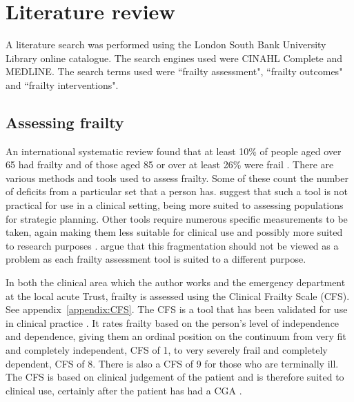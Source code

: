 \documentclass
[
	12pt,
	a4paper,
	oneside,
]{article}
\begin{document}
\section{Literature review}

A literature search was performed using the London South Bank University Library 
online catalogue. The search engines used were CINAHL Complete and MEDLINE. The
search terms used were ``frailty assessment", ``frailty outcomes" and ``frailty 
interventions".

\subsection{Assessing frailty}
An international systematic review found 
that at least 10\% of people aged over 65 had frailty and of those aged 85 or over
at least 26\% were frail \parencite{collard:12}. There are various methods and tools used to assess frailty.
Some of these count the number of deficits from a particular set that a person has. 
\textcite{sternberg:08} suggest that such a tool is not practical for use in a clinical
setting, being more suited to assessing populations for strategic planning. 
Other tools require numerous specific measurements to be taken, again making them
less suitable for clinical use \parencite{martin:08} and possibly more suited to research purposes
\parencite{ensrud:08}. \textcite{romero-ortuno:16} argue that this fragmentation should not
be viewed as a problem as each frailty assessment tool is suited to a different 
purpose. 

In both the clinical area which the author works and the emergency department at
the local acute Trust, frailty is assessed using the Clinical Frailty Scale (CFS).
See appendix~\ref{appendix:CFS}.
The CFS is a tool that has been validated for use in clinical practice 
\parencite{rockwood:05}. It rates frailty based on the person's level of independence
and dependence, giving them an ordinal position on the continuum from very fit and completely 
independent, CFS of 1, to very severely frail and completely dependent, CFS of 8.
There is also a CFS of 9 for those who are terminally ill. The CFS is based on clinical
judgement of the patient and is therefore suited to clinical use, certainly after
the patient has had a CGA \parencite{bgs:14}.
\end{document}
